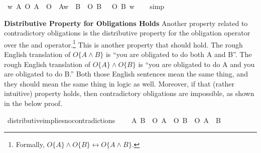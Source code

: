 \begin{isabellebody}
\begin{isamarkuptext}
\medskip%
\end{isamarkuptext}\isamarkuptrue%
\isamarkupfalse%
\ {\isachardoublequoteopen}{\isasymforall}w{\isachardot}\ {\isasymexists}A{\isachardot}\ {\isacharparenleft}{\isacharparenleft}{\isacharparenleft}O\ {\isacharbraceleft}A{\isacharbraceright}\ \isactrlbold {\isasymand}\ O\ {\isacharbraceleft}\isactrlbold {\isasymnot}\ A{\isacharbraceright}{\isacharparenright}w{\isacharparenright}{\isacharparenright}\ {\isasymequiv}\ {\isacharparenleft}{\isasymexists}B{\isachardot}\ {\isacharparenleft}\isactrlbold {\isasymnot}\ {\isacharparenleft}O\ {\isacharbraceleft}B{\isacharbraceright}\ \isactrlbold {\isasymrightarrow}\ \isactrlbold {\isasymnot}\ O\ {\isacharbraceleft}\isactrlbold {\isasymnot}B{\isacharbraceright}{\isacharparenright}{\isacharparenright}\ w{\isacharparenright}{\isachardoublequoteclose}\isanewline
%
\isadelimproof
\ \ %
\endisadelimproof
%
\isatagproof
{}\isamarkupfalse%
\ simp\isanewline
%
\isanewline
%
%
\endisatagproof
{\isafoldproof}%
%
\isadelimproof
%
\endisadelimproof
%
\begin{isamarkuptext}%
\noindent \textbf{Distributive Property for Obligations Holds} Another property related to 
contradictory obligations is the distributive property for the obligation operator over the and 
operator.\footnote{Formally, $O\{A\} \wedge O\{B\} \longleftrightarrow O\{A \wedge B\}$.} This is 
another property that should hold. The rough English translation of  $O \{ A \wedge B \}$ is ``you are obligated to 
do both A and B''. The rough English translation of $O\{A\} \wedge O\{B\}$ is ``you are obligated to do A 
and you are obligated to do B.'' Both those English sentences mean the same thing, and they should mean 
the same thing in logic as well. Moreover, if that (rather intuitive) property holds, then contradictory
obligations are impossible, as shown in the below proof.%
\end{isamarkuptext}\isamarkuptrue%
\isamarkupfalse%
\ distributive{\isacharunderscore}implies{\isacharunderscore}no{\isacharunderscore}contradictions{\isacharcolon}\ \isanewline
\ \ \ {\isachardoublequoteopen}{\isasymforall}A\ B{\isachardot}\ {\isasymTurnstile}\ {\isacharparenleft}{\isacharparenleft}O\ {\isacharbraceleft}A{\isacharbraceright}\ \isactrlbold {\isasymand}\ O\ {\isacharbraceleft}B{\isacharbraceright}{\isacharparenright}\ \isactrlbold {\isasymequiv}\ O\ {\isacharbraceleft}A\ \isactrlbold {\isasymand}\ B{\isacharbraceright}{\isacharparenright}{\isachardoublequoteclose}\isanewline

\end{isabellebody}

